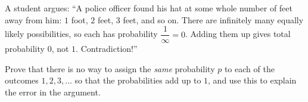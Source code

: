 A student argues: ``A police officer found his hat at some whole number of feet away from him: $1$ foot, $2$ feet, $3$ feet, and so on. There are infinitely many equally likely possibilities, so each has probability $\dfrac{1}{\infty}=0$. Adding them up gives total probability $0$, not $1$. Contradiction!''

Prove that there is no way to assign the \emph{same} probability $p$ to each of the outcomes $1,2,3,\dots$ so that the probabilities add up to $1$, and use this to explain the error in the argument.
